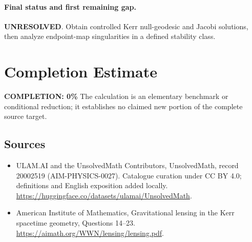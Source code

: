\documentclass[11pt]{article}
\begin{document}
\paragraph{Final status and first remaining gap.}
\textbf{UNRESOLVED}. Obtain controlled Kerr null-geodesic and Jacobi solutions, then analyze endpoint-map singularities in a defined stability class.

\section{Completion Estimate}
\noindent\textbf{COMPLETION: 0\%}
The calculation is an elementary benchmark or conditional reduction; it establishes no claimed new portion of the complete source target.

\subsection{Sources}
\begin{itemize}
\item[\hypertarget{source:20002519:1}{S1}] ULAM.AI and the UnsolvedMath Contributors, UnsolvedMath, record 20002519 (AIM-PHYSICS-0027). Catalogue curation under CC BY 4.0; definitions and English exposition added locally.
\url{https://huggingface.co/datasets/ulamai/UnsolvedMath}.
\item[\hypertarget{source:20002519:2}{S2}] American Institute of Mathematics, Gravitational lensing in the Kerr spacetime geometry, Questions 14–23.
\url{https://aimath.org/WWN/lensing/lensing.pdf}.
\end{itemize}
\label{end:20002519}
\end{document}
